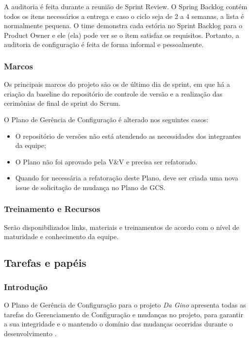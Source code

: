 A auditoria é feita durante a reunião de Sprint Review. O Spring Backlog contém todos os itens necessários a entrega e caso o ciclo seja de 2 a 4 semanas, a lista é normalmente pequena.
O time demonstra cada estória no Sprint Backlog para o Product Owner e ele (ela) pode ver se o item satisfaz os requisitos. Portanto, a auditoria de configuração é feita de forma informal e pessoalmente.

\subsubsection{Marcos}

Os principais marcos do projeto são os de último dia de sprint, em que há a criação da baseline do repositório de controle de versão e a realização das cerimônias de final de sprint do Scrum. 

O Plano de Gerência de Configuração é alterado nos seguintes casos:

\begin{itemize}
\item O repositório de versões não está atendendo as necessidades dos integrantes da equipe;
\item O Plano não foi aprovado pela V\&V e precisa ser refatorado.
\item Quando for necessária a refatoração deste Plano, deve ser criada uma nova issue de solicitação de mudança no Plano de GCS.
\end{itemize}

\subsubsection{Treinamento e Recursos}

Serão disponibilizados links, materiais e treinamentos de acordo com o nível de maturidade e conhecimento da equipe.


\subsection{Tarefas e papéis}

\subsubsection{Introdução}

O Plano de Gerência de Configuração para o projeto \textit{Da Gino} apresenta todas as tarefas do Gerenciamento de Configuração e mudanças no projeto, para garantir a sua integridade e o mantendo o domínio das mudanças ocorridas durante o desenvolvimento \cite{moraes:16}.

